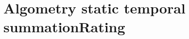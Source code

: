 \section{Algometry static temporal summationRating}
\label{sec:AlgometryStaticTemporalSummationRating}
